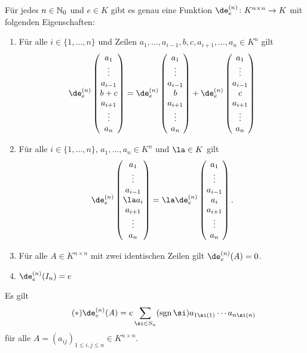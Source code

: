 \documentclass[../../main.tex]{subfiles}
\begin{document}
\begin{sat}\label{9.1.7}
Für jedes $n\in\mathbb N_0$ und $e\in K$ gibt es genau eine Funktion $\de_e^{(n)}\colon K^{n\times n}\to K$ mit folgenden Eigenschaften:
\begin{enumerate}[\rm(a)]
\item Für alle $i\in\{1,\dots,n\}$ und Zeilen
$a_1,\dots,a_{i-1},b,c,a_{i+1},\dots,a_n\in K^n$ gilt
\[\de_e^{(n)}\begin{pmatrix}a_1\\\vdots\\a_{i-1}\\b+c\\a_{i+1}\\\vdots\\a_n\end{pmatrix}=
\de_e^{(n)}\begin{pmatrix}a_1\\\vdots\\a_{i-1}\\b\\a_{i+1}\\\vdots\\a_n\end{pmatrix}+
\de_e^{(n)}\begin{pmatrix}a_1\\\vdots\\a_{i-1}\\c\\a_{i+1}\\\vdots\\a_n\end{pmatrix}\]
\item Für alle $i\in\{1,\dots,n\}$,
$a_1,\dots,a_n\in K^n$ und $\la\in K$ gilt
\[\de_e^{(n)}\begin{pmatrix}a_1\\\vdots\\a_{i-1}\\\la a_i\\a_{i+1}\\\vdots\\a_n\end{pmatrix}=
\la\de_e^{(n)}\begin{pmatrix}a_1\\\vdots\\a_{i-1}\\a_i\\a_{i+1}\\\vdots\\a_n\end{pmatrix}.\]
\item Für alle $A\in K^{n\times n}$ mit zwei identischen Zeilen gilt $\de_e^{(n)}(A)=0$.
\item $\de_e^{(n)}(I_n)=e$
\end{enumerate}
Es gilt
\begin{equation}\label{leibniz}\tag{$*$}\de_e^{(n)}(A)=e\sum_{\si\in S_n}(\sgn\si)a_{1\si(1)}\dotsm a_{n\si(n)}
\end{equation}
für alle $A=(a_{ij})_{1\le i,j\le n}\in K^{n\times n}$.
\end{sat}
\end{document}
